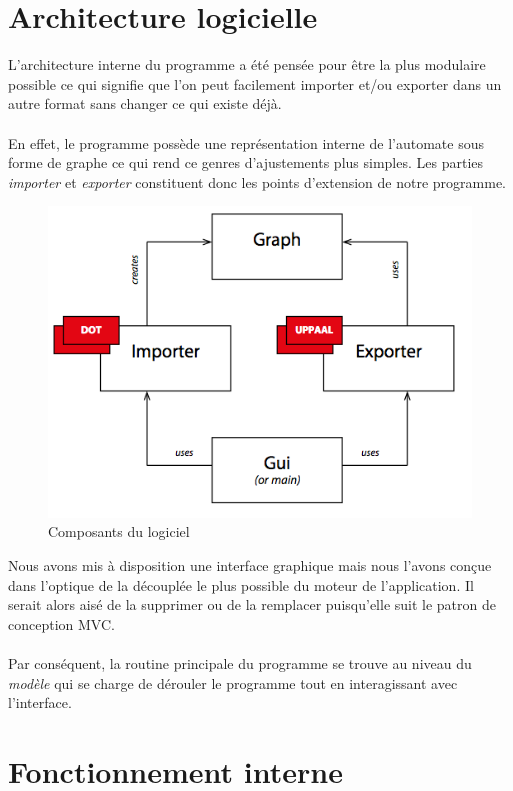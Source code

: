 \documentclass[12pt,a4paper]{report}
\begin{document}
\section{Architecture logicielle}

L'architecture interne du programme a été pensée pour être la plus modulaire possible 
ce qui signifie que l'on peut facilement importer et/ou exporter dans un autre format
sans changer ce qui existe déjà. 
\\\\
En effet, le programme possède une représentation interne de l'automate sous forme 
de graphe ce qui rend ce genres d'ajustements plus simples. Les parties \emph{importer}
et \emph{exporter} constituent donc les points d'extension de notre programme.

\begin{figure}[H]
  \centering
  \includegraphics[scale=0.6]{ressources/archi.png}
  \caption{Composants du logiciel}
\end{figure}

Nous avons mis à disposition une interface graphique mais nous l'avons conçue dans l'optique 
de la découplée le plus possible du moteur de l'application. Il serait alors aisé de la supprimer
ou de la remplacer puisqu'elle suit le patron de conception MVC. 
\\\\
Par conséquent, la routine principale du programme se trouve au niveau du 
\emph{modèle} qui se charge de dérouler le programme tout en interagissant 
avec l'interface.

\section{Fonctionnement interne}
\end{document}
